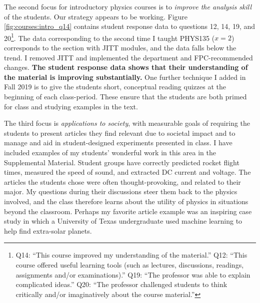 \documentclass[../../main.tex]{subfiles}
\begin{document}
The second focus for introductory physics courses is to \textit{improve the analysis skill} of the students.  Our strategy appears to be working.  Figure \ref{fig:courses:intro_q14} contains student response data to questions 12, 14, 19, and 20\footnote{Q14: ``This course improved my understanding of the material.'' Q12: ``This course offered useful learning tools (such as lectures, discussions, readings, assignments and/or examinations).'' Q19: ``The professor was able to explain complicated ideas.'' Q20: ``The professor challenged students to think critically and/or imaginatively about the course material.''}.  The data corresponding to the second time I taught PHYS135 ($x = 2$) corresponds to the section with JITT modules, and the data falls below the trend.  I removed JITT and implemented the department and FPC-recommended changes.  \textbf{The student response data shows that their understanding of the material is improving substantially.}  One further technique I added in Fall 2019 is to give the students short, conceptual reading quizzes at the beginning of each class-period.  These ensure that the students are both primed for class and studying examples in the text.  \\ \hspace{0.1cm}

The third focus is \textit{applications to society}, with measurable goals of requiring the students to present articles they find relevant due to societal impact and to manage and aid in student-designed experiments presented in class.  I have included examples of my students' wonderful work in this area in the Supplemental Material.  Student groups have correctly predicted rocket flight times, measured the speed of sound, and extracted DC current and voltage.  The articles the students chose were often thought-provoking, and related to their major.  My questions during their discussions steer them back to the physics involved, and the class therefore learns about the utility of physics in situations beyond the classroom.  Perhaps my favorite article example was an inspiring case study in which a University of Texas undergraduate used machine learning to help find extra-solar planets. \\ \hspace{0.1cm}
\end{document}
